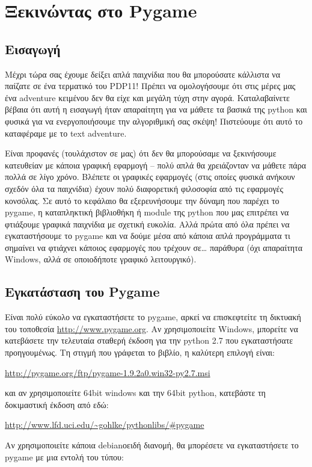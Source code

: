 \chapter{Ξεκινώντας στο Pygame}
\label{chap:pygame-intro}
%
\section{Εισαγωγή}
%
Μέχρι τώρα σας έχουμε δείξει απλά παιχνίδια που θα μπορούσατε κάλλιστα να παίζατε σε ένα τερματικό του PDP11! Πρέπει να ομολογήσουμε ότι στις μέρες μας ένα adventure κειμένου δεν θα είχε και μεγάλη τύχη στην αγορά. Καταλαβαίνετε βέβαια ότι αυτή η εισαγωγή ήταν απαραίτητη για να μάθετε τα βασικά της python και φυσικά για να ενεργοποιήσουμε την αλγοριθμική σας σκέψη! Πιστεύουμε ότι αυτό το καταφέραμε με το text adventure.

Είναι προφανές (τουλάχιστον σε μας) ότι δεν θα μπορούσαμε να ξεκινήσουμε κατευθείαν με κάποια γραφική εφαρμογή -- πολύ απλά θα χρειάζονταν να μάθετε πάρα πολλά σε λίγο χρόνο. Βλέπετε οι γραφικές εφαρμογές (στις οποίες φυσικά ανήκουν σχεδόν όλα τα παιχνίδια) έχουν πολύ διαφορετική φιλοσοφία από τις εφαρμογές κονσόλας. Σε αυτό το κεφάλαιο θα εξερευνήσουμε την δύναμη που παρέχει το pygame, η καταπληκτική βιβλιοθήκη ή module της python που μας επιτρέπει να φτιάξουμε γραφικά παιχνίδια με σχετική ευκολία. Αλλά πρώτα από όλα πρέπει να εγκαταστήσουμε το pygame και να δούμε μέσα από κάποια απλά προγράμματα τι σημαίνει να φτιάχνει κάποιος εφαρμογές που τρέχουν σε\ldots{} παράθυρα (όχι απαραίτητα Windows, αλλά σε οποιοδήποτε γραφικό λειτουργικό).
%
\section{Εγκατάσταση του Pygame}
%
Είναι πολύ εύκολο να εγκαταστήσετε το pygame, αρκεί να επισκεφτείτε τη δικτυακή του τοποθεσία \url{http://www.pygame.org}. Αν χρησιμοποιείτε Windows, μπορείτε να κατεβάσετε την τελευταία σταθερή έκδοση για την python 2.7 που εγκαταστήσατε προηγουμένως. Τη στιγμή που γράφεται το βιβλίο, η καλύτερη επιλογή είναι:

\url{http://pygame.org/ftp/pygame-1.9.2a0.win32-py2.7.msi}

και αν χρησιμοποιείτε 64bit windows και την 64bit python, κατεβάστε τη δοκιμαστική έκδοση από εδώ:

\url{http://www.lfd.uci.edu/~gohlke/pythonlibs/#pygame}

Αν χρησιμοποιείτε κάποια debianοειδή διανομή, θα μπορέσετε να εγκαταστήσετε το pygame με μια εντολή του τύπου:

